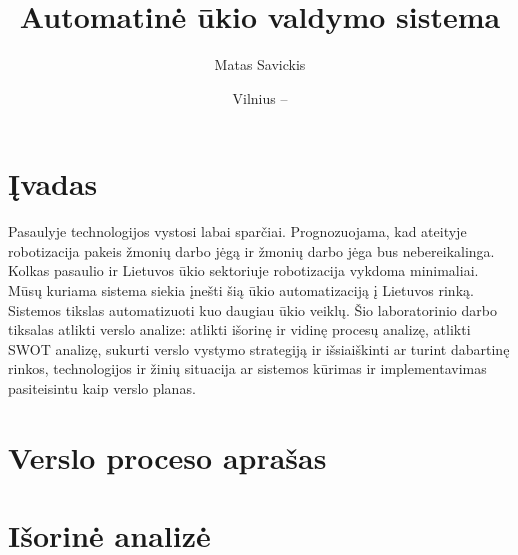 \documentclass[oneside]{VUMIFPSkursinis}
\title{Automatinė ūkio valdymo sistema}
\author{Matas Savickis}
\date{Vilnius – \the\year}
\begin{document}
\maketitle
\tableofcontents


\section{Įvadas}
Pasaulyje technologijos vystosi labai sparčiai. Prognozuojama, kad ateityje robotizacija pakeis žmonių darbo jėgą ir žmonių darbo jėga bus nebereikalinga. Kolkas pasaulio ir Lietuvos ūkio sektoriuje robotizacija vykdoma minimaliai. Mūsų kuriama sistema siekia įnešti šią ūkio automatizaciją į Lietuvos rinką. Sistemos tikslas automatizuoti kuo daugiau ūkio veiklų. Šio laboratorinio darbo tiksalas atlikti verslo analize: atlikti išorinę ir vidinę procesų analizę, atlikti SWOT analizę, sukurti verslo vystymo strategiją ir išsiaiškinti ar turint dabartinę rinkos, technologijos ir žinių situacija ar sistemos kūrimas ir implementavimas pasiteisintu kaip verslo planas.
\section{Verslo proceso aprašas}

\section{Išorinė analizė}
\end{document}
